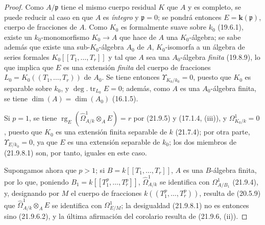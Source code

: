 \begin{proof}
Como $A/\mathfrak p$ tiene el mismo cuerpo residual $K$ que $A$ y es completo,
se puede reducir al caso en que $A$ es \emph{íntegro} y $\mathfrak p=0$; se pondrá
entonces $E=\boldsymbol{k}(\mathfrak p)$, cuerpo de fracciones de $A$. Como $K_0$ es
formalmente suave sobre $k_0$ (19.6.1), existe un $k_0$-monomorfismo
$K_0\to A$ que hace de $A$ una $K_0$-álgebra; se sabe además que existe una
sub-$K_0$-álgebra $A_0$ de $A$, $K_0$-isomorfa a un álgebra de series formales
$K_0[[T_1,\ldots,T_r]]$ y tal que $A$ sea una $A_0$-álgebra \emph{finita}
(19.8.9), lo que implica que $E$ es una extensión \emph{finita} del cuerpo de
fracciones $L_0=K_0((T_1,\ldots,T_r))$ de $A_0$. Se tiene entonces
$\Upsilon_{K_0/k_0}=0$, puesto que $K_0$ es separable sobre $k_0$, y
$\deg.\operatorname{tr}_{L_0}E=0$; además, como $A$ es una $A_0$-álgebra
finita, se tiene $\dim(A)=\dim(A_0)$ (16.1.5).

Si $p=1$, se tiene
$\operatorname{rg}_E(\widehat\Omega^1_{A/k}\otimes_AE)=r$ por (21.9.5) y
(17.1.4, (iii)), y $\Omega^1_{K_0/k}=0$, puesto que $K_0$ es una extensión
finita separable de $k$ (21.7.4); por otra parte,
$\Upsilon_{E/k_0}=0$, ya que $E$ es una extensión separable de $k_0$; los dos
miembros de (21.9.8.1) son, por tanto, iguales en este caso.

Supongamos ahora que $p>1$; si $B=k[[T_1,\ldots,T_r]]$, $A$ es una
$B$-álgebra finita, por lo que, poniendo
$B_1=k[[T_1^p,\ldots,T_r^p]]$, $\widehat\Omega^1_{A/k}$ se identifica con
$\Omega^1_{A/B_1}$ (21.9.4), y, designando por $M$ el cuerpo de fracciones
$k((T_1^p,\ldots,T_r^p))$, resulta de (20.5.9) que
$\widehat\Omega^1_{A/k}\otimes_AE$ se identifica con $\Omega^1_{E/M}$; la
desigualdad (21.9.8.1) no es entonces sino (21.9.6.2), y la última afirmación
del corolario resulta de (21.9.6, (ii)).
\end{proof}
